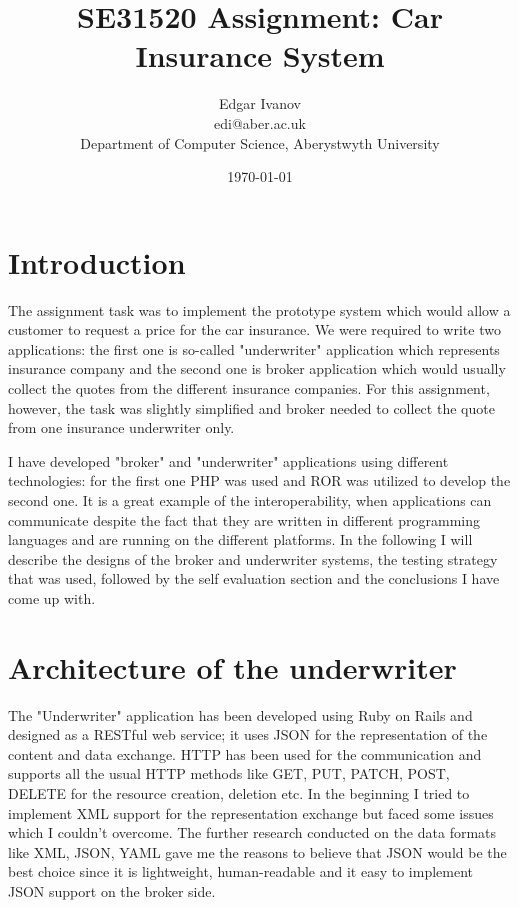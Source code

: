 \documentclass[10pt,a4paper,headinclude=true,twoside]{report}
\begin{document}
\title{SE31520 Assignment: Car Insurance System}
\author{Edgar Ivanov\\ edi@aber.ac.uk \\ Department of Computer Science, Aberystwyth University}
\date{\today}
\maketitle

\newpage
\thispagestyle{empty}
\mbox{}

\tableofcontents

\section{Introduction}
The assignment task was to implement the prototype system which would allow a customer to request a price for the car insurance. We were required to write two applications: the first one is so-called "underwriter" application which represents insurance company and the second one is broker application which would usually collect the quotes from the different insurance companies. For this assignment, however, the task was slightly simplified and broker needed to collect the quote from one insurance underwriter only.

I have developed "broker" and "underwriter" applications using different technologies: for the first one PHP was used and ROR was utilized to develop the second one. It is a great example of the interoperability, when applications can communicate despite the fact that they are written in different programming languages and are running on the different platforms. In the following I will describe the designs of the broker and underwriter systems, the testing strategy that was used, followed by the self evaluation section and the conclusions I have come up with. 

\section{Architecture of the underwriter}

The "Underwriter" application has been developed using Ruby on Rails and designed as a RESTful web service; it uses JSON for the representation of the content and data exchange. HTTP has been used for the communication and supports all the usual HTTP methods like GET, PUT, PATCH, POST, DELETE for the resource creation, deletion etc. In the beginning I tried to implement XML support for the representation exchange but faced some issues which I couldn't overcome. The further research conducted on the data formats like XML, JSON, YAML gave me the reasons to believe that JSON would be the best choice since it is lightweight, human-readable and it easy to implement JSON support on the broker side.
\end{document}
